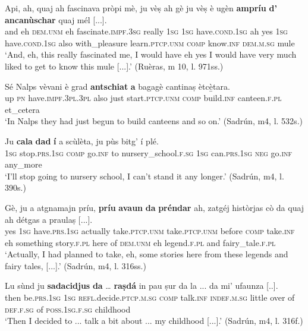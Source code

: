 \ea
\label{ex:preparg1}
\gll Api, ah, quaj ah fascinava pròpi mè, ju vèṣ ah gè ju vèṣ è ugèn \textbf{ampríu} \textbf{d’} \textbf{ancanùschar} quaj mél [...]. \\
and eh \textsc{dem.unm} eh fascinate.\textsc{impf.3sg} really \textsc{1sg}  \textsc{1sg} have.\textsc{cond.1sg} ah yes \textsc{1sg} have.\textsc{cond.1sg} also with\_pleasure learn.\textsc{ptcp.unm} \textsc{comp} know.\textsc{inf} \textsc{dem.m.sg} mule\\
\glt `And, eh, this really fascinated me, I would have eh yes I would have very much liked to get to know this mule [...].' (Ruèras, m 10, l. 971ss.)
\z

\ea
\label{ex:preparg2}
\gll  Sé Nalps vèvani è grad \textbf{antschiat} \textbf{a} bagagè cantinaṣ ètcè̱tara.\\
up \textsc{pn} have.\textsc{impf.3pl.3pl} also just start.\textsc{ptcp.unm} \textsc{comp} build.\textsc{inf} canteen.\textsc{f.pl} et\_cetera\\
\glt `In Nalps they had just begun to build canteens and so on.' (Sadrún, m4, l. 532s.)
\z

\ea
\label{ex:preparg3}
\gll  Ju \textbf{cala} \textbf{dad} \textbf{í} a scùlèta, ju pùs bitg' í plé.\\
\textsc{1sg} stop.\textsc{prs.1sg} \textsc{comp} go.\textsc{inf} to nursery\_school.\textsc{f.sg} \textsc{1sg} can.\textsc{prs.1sg} \textsc{neg} go.\textsc{inf} any\_more  \\
\glt `I’ll stop going to nursery school, I can’t stand it any longer.' (Sadrún, m4, l. 390s.)
\z

\ea
\label{ex:preparg4}
\gll Gè, ju a atgnamajn príu, \textbf{príu} \textbf{avaun} \textbf{da} \textbf{préndar} ah, zatgéj històrjas cò da quaj ah détgas a praulaṣ [...].\\
yes \textsc{1sg} have.\textsc{prs.1sg} actually take.\textsc{ptcp.unm} take.\textsc{ptcp.unm} before \textsc{comp} take.\textsc{inf} eh something story.\textsc{f.pl} here of \textsc{dem.unm} eh legend.\textsc{f.pl} and fairy\_tale.\textsc{f.pl}\\
\glt `Actually, I had planned to take, eh, some stories here from these legends and fairy tales, [...].' (Sadrún, m4, l. 316ss.)
\z

\ea
\label{ex:preparg5}
\gll Lu sùnd ju \textbf{sadacidjus} \textbf{da} … \textbf{raṣdá} in pau ṣur da la ... da mi’ ufaunza [..].\\
then be.\textsc{prs.1sg}  \textsc{1sg}  \textsc{refl}.decide.\textsc{ptcp.m.sg}  \textsc{comp} {} talk.\textsc{inf} \textsc{indef.m.sg} little over of  \textsc{def.f.sg} {} of  \textsc{poss.1sg.f.sg} childhood\\
\glt `Then I decided to ... talk a bit about ... my childhood [...].' (Sadrún, m4, l. 316f.)
\z

